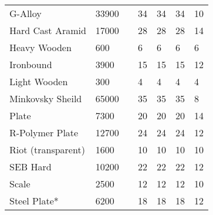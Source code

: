 \documentclass[twoside]{book}
\begin{document}
\begin{longtable}{p{1.25in}llp{3em}p{3em}p{3em}p{3em}}
      \raggedright G-Alloy & 33900 && 34 & 34 & 34 & 10 \tabularnewline
      \raggedright Hard Cast Aramid & 17000 && 28 & 28 & 28 & 14 \tabularnewline
      \raggedright Heavy Wooden & 600 && 6 & 6 & 6 & 6 \tabularnewline
      \raggedright Ironbound & 3900 && 15 & 15 & 15 & 12 \tabularnewline
      \raggedright Light Wooden & 300 && 4 & 4 & 4 & 4 \tabularnewline
      \raggedright Minkovsky Sheild & 65000 && 35 & 35 & 35 & 8 \tabularnewline
      \raggedright Plate & 7300 && 20 & 20 & 20 & 14 \tabularnewline
      \raggedright R-Polymer Plate & 12700 && 24 & 24 & 24 & 12 \tabularnewline
      \raggedright Riot (transparent) & 1600 && 10 & 10 & 10 & 10 \tabularnewline
      \raggedright SEB Hard & 10200 && 22 & 22 & 22 & 12 \tabularnewline
      \raggedright Scale & 2500 && 12 & 12 & 12 & 10 \tabularnewline
      \raggedright Steel Plate* & 6200 && 18 & 18 & 18 & 12 \tabularnewline
      
\end{longtable}
    
\end{document}
